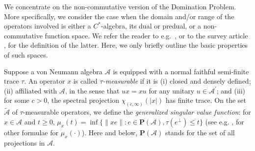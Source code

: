\documentclass[12pt]{amsart}
\theoremstyle{plain}
\theoremstyle{definition}
\renewcommand{\leq}{\leqslant}
\renewcommand{\geq}{\geqslant}\usepackage{amssymb}
\newcommand{\pp}{\mathbf P}
\newcommand{\A}{\mathcal{A}}
\begin{document}
We concentrate on the non-commutative version of the Domination Problem.
More specifically, we consider the case when the domain and/or
range of the operators involved is either a $C^*$-algebra, its dual or
predual, or a non-commutative function space. We refer the reader to
e.g.~\cite{DDdP93}, or to the survey article \cite{deP}, for the
definition of the latter. Here, we only briefly outline the basic
properties of such spaces.

Suppose a von Neumann algebra $\A$ is equipped with a normal faithful
semi-finite trace $\tau$. An operator $x$ is called \emph{$\tau$-measurable}
if it is (i) closed and densely defined; (ii) affiliated with $\A$, in the sense that
$u x = x u$ for any unitary $u \in \A^\prime$; and (iii) for some $c > 0$,
the spectral projection $\chi_{(c,\infty)}(|x|)$ has finite trace.
On the set $\tilde{\A}$ of $\tau$-measurable operators,
we define the \emph{generalized singular value function}:
for $x \in \A$ and $t \geq 0$,
$\mu_x(t) = \inf\{\|xe\| : e \in \pp(\A), \tau(e^\perp) \leq t\}$
(see e.g. \cite{deP}, \cite{FK} for other formulae for $\mu_x( \cdot )$).
Here and below, $\pp(\A)$ stands for the set of all projections in $\A$.
\end{document}
